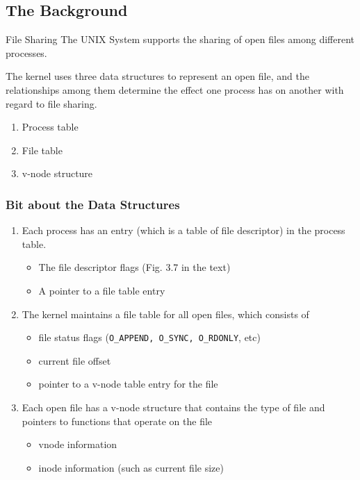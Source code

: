 \documentclass[newPxFont,sthlmFooter,nooffset]{beamer}
\begin{document}
\subsection{The Background}

\begin{frame}[t]{File Sharing}
The UNIX System supports the sharing of open files among different processes.

\bigskip
The kernel uses three data structures to represent an open file, and the relationships among them determine the effect one process has on another with regard to file sharing.

\bigskip
\begin{enumerate}
\item Process table
\item File table
\item v-node structure
\end{enumerate}

\end{frame}


\begin{frame}
  \frametitle{Bit about the Data Structures}
\begin{enumerate}
\item Each process has an entry (which is a table of file descriptor) in the process table.
  \begin{itemize}
  \item The file descriptor flags (Fig. 3.7 in the text)
  \item A pointer to a file table entry
  \end{itemize}
\item The kernel maintains a file table for all open files, which consists of
  \begin{itemize}
  \item file status flags (\texttt{O\_APPEND, O\_SYNC, O\_RDONLY}, etc)
  \item current file offset
  \item pointer to a v-node table entry for the file
  \end{itemize}
\item Each open file has a v-node structure that contains the type of file and pointers to functions that operate on the file
  \begin{itemize}
  \item vnode information
  \item inode information (such as current file size)
  \end{itemize}
\end{enumerate}
\end{frame}
\end{document}
